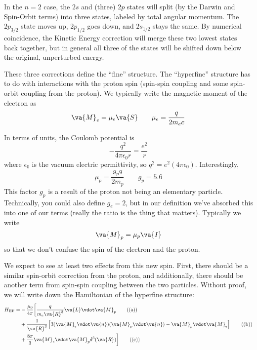 \documentclass[a4paper,twoside,master.tex]{subfiles}
\begin{document}

In the $ n = 2 $ case, the $ 2s $ and (three) $ 2p $ states will split (by the Darwin and Spin-Orbit terms) into three states, labeled by total angular momentum. The $ 2p_{3/2} $ state moves up, $ 2p_{1/2} $ goes down, and $ 2s_{1/2} $ stays the same. By numerical coincidence, the Kinetic Energy correction will merge these two lowest states back together, but in general all three of the states will be shifted down below the original, unperturbed energy.

These three corrections define the ``fine'' structure. The ``hyperfine'' structure has to do with interactions with the proton spin (spin-spin coupling and some spin-orbit coupling from the proton). We typically write the magnetic moment of the electron as
\begin{equation}
    \va{M}_e = \mu_e \va{S} \qquad \mu_e = \frac{q}{2m_e c}
\end{equation}

In terms of units, the Coulomb potential is
\begin{equation}
    - \frac{q^2}{4 \pi \epsilon_0 r} = \frac{e^2}{r}
\end{equation}
where $ \epsilon_0 $ is the vacuum electric permittivity, so $ q^2 = e^2 (4 \pi \epsilon_0) $. Interestingly,
\begin{equation}
    \mu_p = \frac{g_pq}{2m_p} \qquad g_p = 5.6
\end{equation}
This factor $ g_p $ is a result of the proton not being an elementary particle. Technically, you could also define $ g_e = 2 $, but in our definition we've absorbed this into one of our terms (really the ratio is the thing that matters). Typically we write
\begin{equation}
    \va{M}_p = \mu_p \va{I}
\end{equation}
so that we don't confuse the spin of the electron and the proton.

We expect to see at least two effects from this new spin. First, there should be a similar spin-orbit correction from the proton, and additionally, there should be another term from spin-spin coupling between the two particles. Without proof, we will write down the Hamiltonian of the hyperfine structure:
\begin{align}\label{eq:hf_structure}
    H_{\text{HF}} = &- \frac{\mu_0}{4 \pi} \bigg[ \frac{q}{m_e \va{R}^3} \va{L} \vdot \va{M}_p\tag{(a)} \\
        &+ \frac{1}{\va{R}^3} \left[ 3(\va{M}_e \vdot \vu{n})(\va{M}_p \vdot \vu{n})- \va{M}_p \vdot \va{M}_e \right]\tag{(b)} \\
    &+ \frac{8 \pi}{3} \va{M}_e \vdot \va{M}_p \delta^{3}(\va{R}) \bigg]\tag{(c)}
\end{align}
\end{document}
